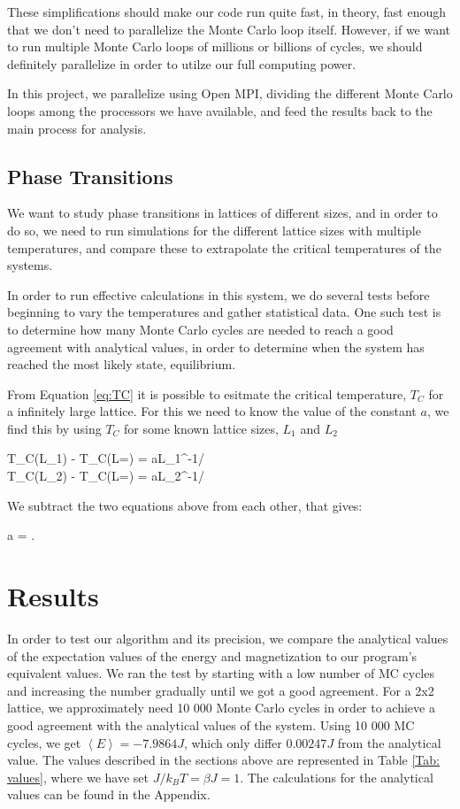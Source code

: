 \documentclass{article}
\begin{document}
		These simplifications should make our code run quite fast, in theory, fast enough that we don't need to parallelize the Monte Carlo loop itself. However, if we want to run multiple Monte Carlo loops of millions or billions of cycles, we should definitely parallelize in order to utilze our full computing power.

		In this project, we parallelize using Open MPI, dividing the different Monte Carlo loops among the processors we have available, and feed the results back to the main process for analysis.

	\subsection{Phase Transitions}
		We want to study phase transitions in lattices of different sizes, and in order to do so, we need to run simulations for the different lattice sizes with multiple temperatures, and compare these to extrapolate the critical temperatures of the systems.

		In order to run effective calculations in this system, we do several tests before beginning to vary the temperatures and gather statistical data. One such test is to determine how many Monte Carlo cycles are needed to reach a good agreement with analytical values, in order to determine when the system has reached the most likely state, equilibrium.

		From Equation \ref{eq:TC} it is possible to esitmate the critical temperature, $T_C$ for a infinitely large lattice. For this we need to know the value of the constant $a$, we find this by using $T_C$ for some known lattice sizes, $L_1$ and $L_2$

		\begin{flalign*}
			T_C(L_1) - T_C(L=\infty) = aL_1^{-1/\nu}\\
			T_C(L_2) - T_C(L=\infty) = aL_2^{-1/\nu}
		\end{flalign*}

		We subtract the two equations above from each other, that gives:

		\begin{flalign}
			a = .
			\label{eq:a}
		\end{flalign}

\section{Results}
	In order to test our algorithm and its precision, we compare the analytical values of the expectation values of the energy and magnetization to our program's equivalent values. We ran the test by starting with a low number of MC cycles and increasing the number gradually until we got a good agreement.
	For a 2x2 lattice, we approximately need 10 000 Monte Carlo cycles in order to achieve a good agreement with the analytical values of the system. Using 10 000 MC cycles, we get $\left<E\right> = -7.9864 J$, which only differ $0.00247 J$ from the analytical value. The values described in the sections above are represented in Table \ref{Tab: values}, where we have set $J/k_BT =\beta J = 1$. The calculations for the analytical values can be found in the Appendix.
\end{document}
